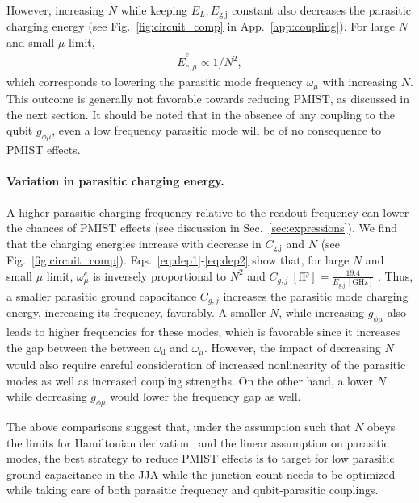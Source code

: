 \documentclass[%
reprint,
superscriptaddress,
 amsmath,amssymb,
 aps,
 prx,
longbibliography,
floatfix,
]{revtex4-2}
\begin{document}
However, increasing $N$ while keeping $E_L, E_{\textrm{g,j}}$ constant also decreases the parasitic charging energy (see Fig.~\ref{fig:circuit_comp} in App.~\ref{app:coupling}). For large $N$ and small $\mu$ limit,
\begin{align}
\tilde{E}_{c,\mu}^e\propto 1/N^2,  \label{eq:dep2} 
\end{align}
which corresponds to lowering the parasitic mode frequency $\omega_\mu$ with increasing $N$. This outcome is generally not favorable towards reducing PMIST, as discussed in the next section. It should be noted that in the absence of any coupling to the qubit $g_{\phi\mu}$, even a low frequency parasitic mode will be of no consequence to PMIST effects.

\paragraph{Variation in parasitic charging energy.}\label{par-freq}  A higher parasitic charging frequency relative to the readout frequency can lower the chances of PMIST effects (see discussion in Sec.~\ref{sec:expressions}). We find that the charging energies increase with decrease in $C_\textrm{g,j}$ and $N$ (see Fig.~\ref{fig:circuit_comp}). Eqs.~\ref{eq:dep1}-\ref{eq:dep2} show that, for large $N$ and small $\mu$ limit, $\omega_\mu^e$ is inversely proportional to $N^2$ and $C_{g,j} \ \mathrm{[fF]}=\frac{19.4}{E_{\textrm{g,j}} \ \mathrm{[GHz]}}$ . Thus, a smaller parasitic ground capacitance $C_{g,j}$ increases the parasitic mode charging energy, increasing its frequency, favorably. A smaller $N$, while increasing $g_{\phi\mu}$  also leads to higher frequencies for these modes, which is favorable since it increases the gap between the between $\omega_\textrm{d}$ and $\omega_\mu$. However, the impact of decreasing $N$ would also require careful consideration of increased nonlinearity of the parasitic modes as well as increased coupling strengths. On the other hand, a lower $N$ while decreasing $g_{\phi\mu}$ would lower the frequency gap as well.

The above comparisons suggest that, under the assumption such that $N$ obeys the limits for Hamiltonian derivation~\cite{viola2015collective} and the linear assumption on parasitic modes, the best strategy to reduce PMIST effects is to target for low parasitic ground capacitance in the JJA while the junction count needs to be optimized while taking care of both parasitic frequency and qubit-parasitic couplings.
\end{document}
